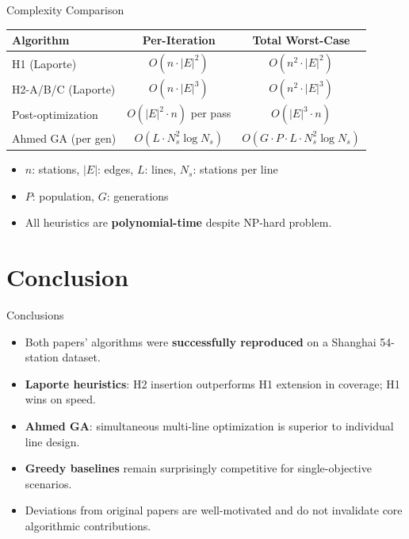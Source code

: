 \documentclass[aspectratio=169, 11pt]{beamer}
\begin{document}
\begin{frame}{Complexity Comparison}

\centering
\small
\begin{tabular}{lcc}
\toprule
\textbf{Algorithm} & \textbf{Per-Iteration} & \textbf{Total Worst-Case} \\
\midrule
H1 (Laporte)     & \(O(n \cdot |E|^2)\) & \(O(n^2 \cdot |E|^2)\) \\
H2-A/B/C (Laporte) & \(O(n \cdot |E|^3)\) & \(O(n^2 \cdot |E|^3)\) \\
Post-optimization  & \(O(|E|^2 \cdot n)\) per pass & \(O(|E|^3 \cdot n)\) \\
\midrule
Ahmed GA (per gen) & \(O(L \cdot N_s^2 \log N_s)\) & \(O(G \cdot P \cdot L \cdot N_s^2 \log N_s)\) \\
\bottomrule
\end{tabular}

\vspace{0.3cm}
\begin{itemize}
    \item \(n\): stations, \(|E|\): edges, \(L\): lines, \(N_s\): stations per line
    \item \(P\): population, \(G\): generations
    \item All heuristics are \textbf{polynomial-time} despite NP-hard problem.
\end{itemize}
\end{frame}

\section{Conclusion}

\begin{frame}{Conclusions}

\begin{itemize}
    \item Both papers' algorithms were \textbf{successfully reproduced} on a Shanghai 54-station dataset.
    \item \textbf{Laporte heuristics}: H2 insertion outperforms H1 extension in coverage; H1 wins on speed.
    \item \textbf{Ahmed GA}: simultaneous multi-line optimization is superior to individual line design.
    \item \textbf{Greedy baselines} remain surprisingly competitive for single-objective scenarios.
    \item Deviations from original papers are well-motivated and do not invalidate core algorithmic contributions.
\end{itemize}
\end{frame}
\end{document}

